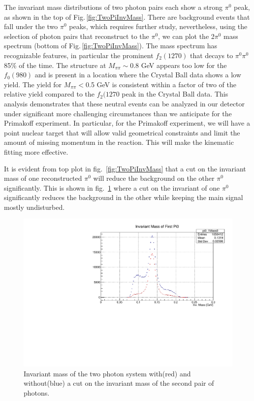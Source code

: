 
The invariant mass distributions of two photon pairs each show a
strong $\pi^0$ peak, as shown in the top of
Fig.\,\ref{fig:TwoPiInvMass}. There are background events that fall
under the two $\pi^0$ peaks, which requires further study,
nevertheless, using the selection of photon pairs that reconstruct to
the $\pi^0$, we can plot the 2$\pi^0$ mass spectrum (bottom of
Fig.\,\ref{fig:TwoPiInvMass}). The mass spectrum has recognizable
features, in particular the prominent $f_2(1270)$ that decays to
$\pi^0\pi^0$ 85\% of the time. The structure at $M_{\pi\pi}\sim$0.8
GeV appears too low for the $f_0(980)$ and is present in a location
where the Crystal Ball data \cite{Marsiske:1990hx} shows a low
yield. The yield for $M_{\pi\pi}<$0.5 GeV is consistent within a
factor of two of the relative yield compared to the $f_2(1270$ peak in
the Crystal Ball data. This analysis demonstrates that these neutral
events can be analyzed in our detector under significant more
challenging circumstances than we anticipate for the Primakoff
experiment. In particular, for the Primakoff experiment, we will have
a point nuclear target that will allow valid geometrical constraints
and limit the amount of missing momentum in the reaction. This will
make the kinematic fitting more effective.

It is evident from top plot in fig.~\ref{fig:TwoPiInvMass} that a cut
on the invariant mass of one reconstructed $\pi^{0}$ will reduce the
background on the other $\pi^{0}$ significantly. This is shown in
fig.~\ref{fig:pi0yield} where a cut on the invariant of one $\pi^{0}$
significantly reduces the background in the other while keeping the
main signal mostly undisturbed.
\begin{figure}[htp]
\centering\includegraphics[width=4.75in]{figures/pi0_inv_mass_withpi02cut.pdf}
\caption{Invariant mass of the two photon system with(red) and without(blue) a cut on the invariant mass of the second pair of photons.
\label{fig:pi0yield}}
\end{figure}

